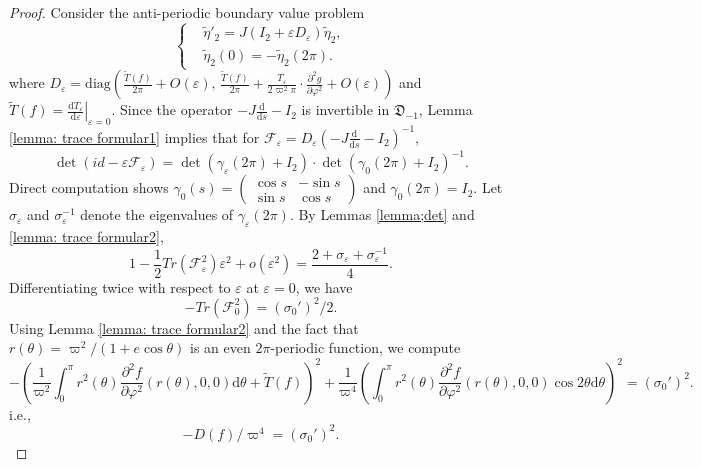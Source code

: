 \documentclass[11pt]{amsart}
\newcommand{\ep}{\varepsilon}
\newcommand{\om}{\varpi}
\begin{document}
\begin{proof}
	Consider the anti-periodic boundary value problem 
	\begin{equation}\label{eq:linear equation}
		\left\{\begin{aligned}
			&\tilde{\eta}'_2=J(I_2+\ep D_{\ep})\tilde{\eta}_2,\\
			&\tilde{\eta}_2(0)=-\tilde{\eta}_2(2\pi).
		\end{aligned}\right.
	\end{equation}
	where $D_{\ep}=\text{diag}\left(\frac{\tilde{T}(f)}{2\pi}+O(\ep),\, \frac{\tilde{T}(f)}{2\pi}+\frac{T_{\ep}}{2\om^{2}\pi}\cdot\frac{\partial^{2}g}{\partial \varphi^{2}}+O(\ep)\right)$ and $\tilde{T}(f)=\left.\frac{\mathrm{d}T_{\ep}}{\mathrm{d}\ep}\right|_{\ep=0}$. Since the operator $-J\frac{\mathrm{d}}{\mathrm{d}s}-I_2$ is invertible in $\mathfrak{D}_{-1}$, Lemma \ref{lemma: trace formular1} implies that for $\mathcal{F}_\ep=D_{\ep}\left(-J\frac{\mathrm{d}}{\mathrm{d}s}-I_2\right)^{-1}$, 
	\begin{equation*}
		\det(id-\ep\mathcal{F}_\ep)=\det(\gamma_{\ep}(2\pi)+I_2)\cdot\det(\gamma_{0}(2\pi)+I_2)^{-1}.
	\end{equation*}
	Direct computation shows $\gamma_0(s) = \begin{pmatrix} \cos s & -\sin s \\ \sin s & \cos s \end{pmatrix}$ and $\gamma_{0}(2\pi)=I_2$. Let $\sigma_{\ep}$ and $\sigma^{-1}_{\ep}$ denote the eigenvalues of $\gamma_{\ep}(2\pi)$. By Lemmas \ref{lemma;det} and \ref{lemma: trace formular2},
	\begin{equation*}
		1 - \frac{1}{2} Tr(\mathcal{F}_{\ep}^2) \ep^2 + o(\ep^2) = \frac{2 + \sigma_{\ep} + \sigma_{\ep}^{-1}}{4}.
	\end{equation*}
	Differentiating twice with respect to $\ep$ at $\ep=0$, we have
	\begin{equation*}
		-Tr(\mathcal{F}_0^2)= (\sigma_{0}')^{2}/2.
	\end{equation*}
	Using Lemma \ref{lemma: trace formular2} and the fact that $r(\theta)=\om^2/(1+e\cos\theta)$ is an even $2\pi$-periodic function, we compute
	\begin{equation*}
		-\left(\frac{1}{\om^{2}}\int_{0}^{\pi}r^{2}(\theta)\frac{\partial^{2}f}{\partial\varphi^{2}}(r(\theta),0,0)\mathrm{d}\theta+\tilde{T}(f)\right)^{2}+\frac{1}{\om^{4}}\left(\int_{0}^{\pi}r^{2}(\theta)\frac{\partial^{2}f}{\partial\varphi^{2}}(r(\theta),0,0)\cos2\theta\mathrm{d}\theta\right)^{2}=(\sigma_{0}')^{2}.
	\end{equation*}
    i.e.,
    \begin{equation}
    	-D(f)\slash \om^4=(\sigma_{0}')^{2}.
    \end{equation}


\end{proof}
\end{document}
